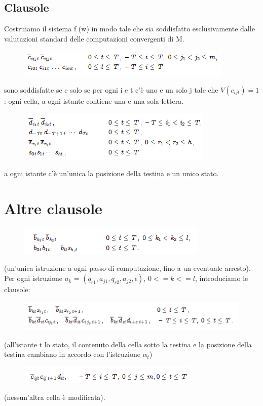 \subsection{Clausole}
Costruiamo il sistema f (w) in modo tale che sia soddisfatto esclusivamente dalle valutazioni standard delle computazioni convergenti di M.
\begin{figure}[htp]
    \centering
    \includegraphics[scale=0.9]{tesi_stile/img/foto6cap12.png}
\end{figure}
sono soddisfatte se e solo se per ogni i e t c’è uno e un solo j tale che $V(c_{ijt}) = 1$: ogni cella, a ogni istante contiene una e una sola lettera.
\begin{figure}[htp]
    \centering
    \includegraphics[scale=0.9]{tesi_stile/img/foto7cap12.png}
\end{figure}
a ogni istante c’è un’unica la posizione della testina e un unico stato.
\section{Altre clausole}
\begin{figure}[htp]
    \centering
    \includegraphics[scale=0.9]{tesi_stile/img/foto8cap12.png}
\end{figure}
(un’unica istruzione a ogni passo di computazione, fino a un eventuale
arresto).\\
Per ogni istruzione $a_k$ = $(q_{r1}, a_{j1}, q_{r2}, a_{j2}, \epsilon)$, $0 <= k <= l$, introduciamo le
clausole:
\begin{figure}[htp]
    \centering
    \includegraphics[scale=0.9]{tesi_stile/img/foto9cap12.png}
\end{figure}
(all’istante t lo stato, il contenuto della cella sotto la testina e la posizione della testina cambiano in accordo con l’istruzione $\alpha_t$)
\begin{figure}[htp]
    \centering
    \includegraphics[scale=0.9]{tesi_stile/img/foto10cap12.png}
\end{figure}
(nessun’altra cella è modificata).
\newpage

